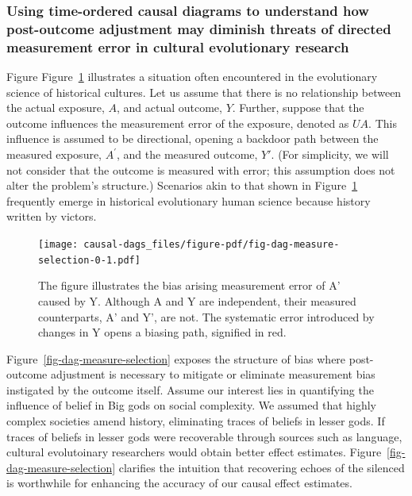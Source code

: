 \documentclass[
  singlecolumn]{article}
\begin{document}
\hypertarget{using-time-ordered-causal-diagrams-to-understand-how-post-outcome-adjustment-may-diminish-threats-of-directed-measurement-error-in-cultural-evolutionary-research}{%
\subsubsection{Using time-ordered causal diagrams to understand how
post-outcome adjustment may diminish threats of directed measurement
error in cultural evolutionary
research}\label{using-time-ordered-causal-diagrams-to-understand-how-post-outcome-adjustment-may-diminish-threats-of-directed-measurement-error-in-cultural-evolutionary-research}}

Figure Figure~\ref{fig-dag-measure-selection-0} illustrates a situation
often encountered in the evolutionary science of historical cultures.
Let us assume that there is no relationship between the actual exposure,
\(A\), and actual outcome, \(Y\). Further, suppose that the outcome
influences the measurement error of the exposure, denoted as \(UA\).
This influence is assumed to be directional, opening a backdoor path
between the measured exposure, \(A^{\prime}\), and the measured outcome,
\(Y'\). (For simplicity, we will not consider that the outcome is
measured with error; this assumption does not alter the problem's
structure.) Scenarios akin to that shown in
Figure~\ref{fig-dag-measure-selection-0} frequently emerge in historical
evolutionary human science because history written by victors.

\begin{figure}

{\centering \texttt{[image: causal-dags\_files/figure-pdf/fig-dag-measure-selection-0-1.pdf]}

}

\caption{\label{fig-dag-measure-selection-0}The figure illustrates the
bias arising measurement error of A' caused by Y. Although A and Y are
independent, their measured counterparts, A' and Y', are not. The
systematic error introduced by changes in Y opens a biasing path,
signified in red.}

\end{figure}

Figure~\ref{fig-dag-measure-selection} exposes the structure of bias
where post-outcome adjustment is necessary to mitigate or eliminate
measurement bias instigated by the outcome itself. Assume our interest
lies in quantifying the influence of belief in Big gods on social
complexity. We assumed that highly complex societies amend history,
eliminating traces of beliefs in lesser gods. If traces of beliefs in
lesser gods were recoverable through sources such as language, cultural
evolutoinary researchers would obtain better effect estimates.
Figure~\ref{fig-dag-measure-selection} clarifies the intuition that
recovering echoes of the silenced is worthwhile for enhancing the
accuracy of our causal effect estimates.
\end{document}
